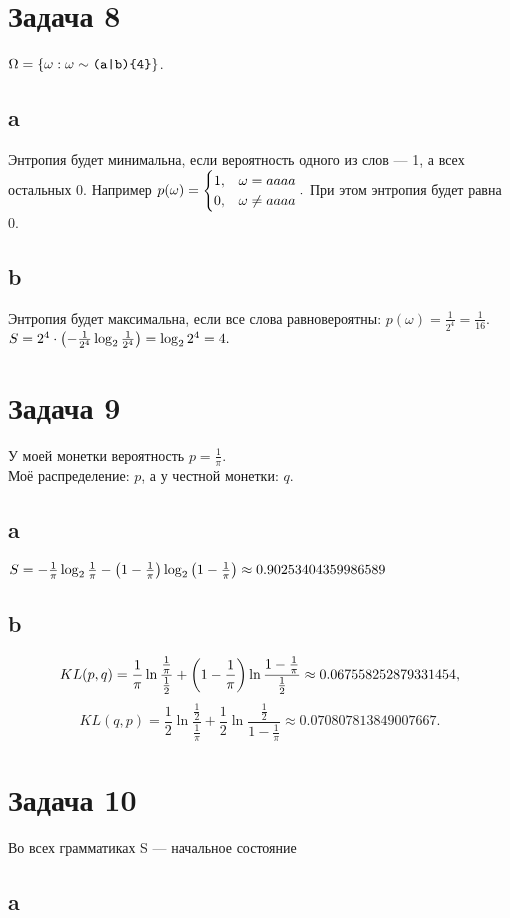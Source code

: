 \documentclass[12pt]{article}
\begin{document}
\section{Задача 8}
$\Omega=\left\{\omega: \omega \sim \text{\ttfamily(a|b)\{4\}}\right\}$.
\subsection{a}
Энтропия будет минимальна, если вероятность одного из слов --- 1, а всех остальных 0. Например $p(\omega)=\begin{cases}1, &\omega=aaaa\\0, &\omega\ne aaaa\end{cases}.$ При этом энтропия будет равна 0.

\subsection{b}
Энтропия будет максимальна, если все слова равновероятны: $p(\omega)=\frac1{2^4}=\frac1{16}.$ $S = 2^4\cdot\left(-\frac1{2^4}\log_2\frac1{2^4}\right) = \log_2 2^4 = 4.$

\section{Задача 9}
У моей монетки вероятность $p=\frac1\pi$. \\
Моё распределение: $p$, а у честной монетки: $q.$
\subsection{a}
$S = -\frac1\pi \log_2\frac1\pi - \left(1-\frac1\pi\right) \log_2\left(1 - \frac1\pi\right) \approx 0{.}90253404359986589$

\subsection{b}
$$KL(p,q) = \frac1\pi \ln\frac{\frac1\pi}{\frac12} + \left(1-\frac1\pi\right) \ln\frac{1 - \frac1\pi}{\frac12} \approx 0{.}067558252879331454,$$
$$KL(q,p) = \frac12 \ln\frac{\frac12}{\frac1\pi} + \frac12 \ln\frac{\frac12}{1-\frac1\pi} \approx 0{.}070807813849007667.$$

\section{Задача 10}
Во всех грамматиках S --- начальное состояние
\subsection{a}
\end{document}
